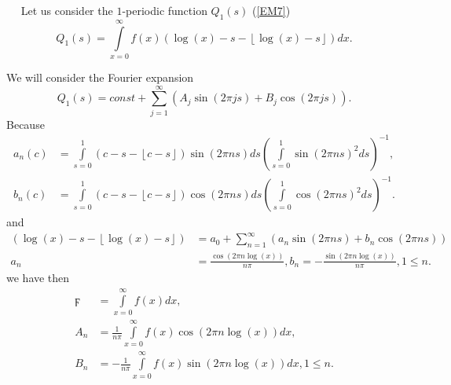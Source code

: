 \documentclass[titlepage,fleqn]{article}%
\begin{document}
\
\label{FourieExpan}%
\ Let us consider the $1$-periodic function $Q_{1}(s)$ (\ref{EM7})
\begin{equation}
Q_{1}(s)=%
{\displaystyle\int\limits_{x=0}^{\infty}}
f(x)\left(  \log\left(  x\right)  -s-\left\lfloor \log\left(  x\right)
-s\right\rfloor \right)  dx. \label{Fouri1}%
\end{equation}


We will consider the Fourier expansion%
\[
Q_{1}(s)=const+%
{\displaystyle\sum\limits_{j=1}^{\infty}}
\left(  A_{j}\sin\left(  2\pi js\right)  +B_{j}\cos\left(  2\pi js\right)
\right)  .
\]
Because%
\begin{align*}
a_{n}(c)  &  =%
{\displaystyle\int\limits_{s=0}^{1}}
\left(  c-s-\left\lfloor c-s\right\rfloor \right)  \sin\left(  2\pi ns\right)
ds\left(
{\displaystyle\int\limits_{s=0}^{1}}
\sin\left(  2\pi ns\right)  ^{2}ds\right)  ^{-1},\\
b_{n}(c)  &  =%
{\displaystyle\int\limits_{s=0}^{1}}
\left(  c-s-\left\lfloor c-s\right\rfloor \right)  \cos\left(  2\pi ns\right)
ds\left(
{\displaystyle\int\limits_{s=0}^{1}}
\cos\left(  2\pi ns\right)  ^{2}ds\right)  ^{-1}.
\end{align*}
and%
\begin{align*}
\left(  \log\left(  x\right)  -s-\left\lfloor \log\left(  x\right)
-s\right\rfloor \right)   &  =a_{0}+%
{\displaystyle\sum\limits_{n=1}^{\infty}}
\left(  a_{n}\sin\left(  2\pi ns\right)  +b_{n}\cos\left(  2\pi ns\right)
\right) \\
a_{n}  &  =\frac{\cos(2\pi n\log\left(  x\right)  )}{n\pi},b_{n}=-\frac
{\sin(2\pi n\log\left(  x\right)  )}{n\pi},1\leq n.
\end{align*}
we have then%
\begin{align}
\digamma &  =%
{\displaystyle\int\limits_{x=0}^{\infty}}
f(x)dx,\label{Fouri2}\\
A_{n}  &  =\frac{1}{n\pi}%
{\displaystyle\int\limits_{x=0}^{\infty}}
f(x)\cos(2\pi n\log\left(  x\right)  )dx,\\
B_{n}  &  =-\frac{1}{n\pi}%
{\displaystyle\int\limits_{x=0}^{\infty}}
f(x)\sin(2\pi n\log\left(  x\right)  )dx,1\leq n.\nonumber
\end{align}
\end{document}

